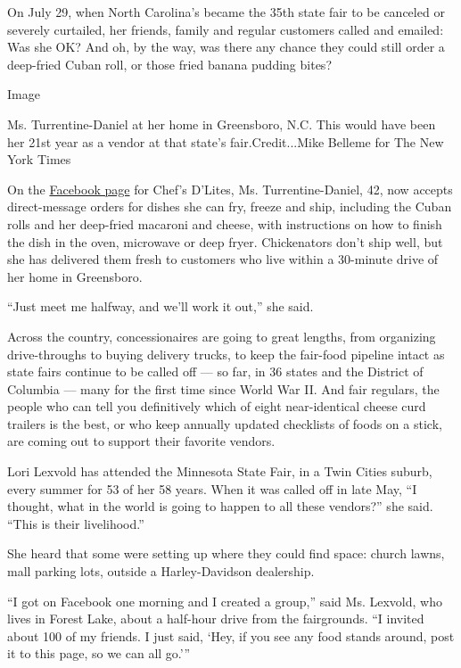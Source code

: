 On July 29, when North Carolina's became the 35th state fair to be
canceled or severely curtailed, her friends, family and regular
customers called and emailed: Was she OK? And oh, by the way, was there
any chance they could still order a deep-fried Cuban roll, or those
fried banana pudding bites?

Image

Ms. Turrentine-Daniel at her home in Greensboro, N.C. This would have
been her 21st year as a vendor at that state's fair.Credit...Mike
Belleme for The New York Times

On the \href{https://www.facebookcorewwwi.onion/chefsdlites/}{Facebook
page} for Chef's D'Lites, Ms. Turrentine-Daniel, 42, now accepts
direct-message orders for dishes she can fry, freeze and ship, including
the Cuban rolls and her deep-fried macaroni and cheese, with
instructions on how to finish the dish in the oven, microwave or deep
fryer. Chickenators don't ship well, but she has delivered them fresh to
customers who live within a 30-minute drive of her home in Greensboro.

``Just meet me halfway, and we'll work it out,'' she said.

Across the country, concessionaires are going to great lengths, from
organizing drive-throughs to buying delivery trucks, to keep the
fair-food pipeline intact as state fairs continue to be called off ---
so far, in 36 states and the District of Columbia --- many for the first
time since World War II. And fair regulars, the people who can tell you
definitively which of eight near-identical cheese curd trailers is the
best, or who keep annually updated checklists of foods on a stick, are
coming out to support their favorite vendors.

Lori Lexvold has attended the Minnesota State Fair, in a Twin Cities
suburb, every summer for 53 of her 58 years. When it was called off in
late May, ``I thought, what in the world is going to happen to all these
vendors?'' she said. ``This is their livelihood.''

She heard that some were setting up where they could find space: church
lawns, mall parking lots, outside a Harley-Davidson dealership.

``I got on Facebook one morning and I created a group,'' said Ms.
Lexvold, who lives in Forest Lake, about a half-hour drive from the
fairgrounds. ``I invited about 100 of my friends. I just said, `Hey, if
you see any food stands around, post it to this page, so we can all
go.'''

